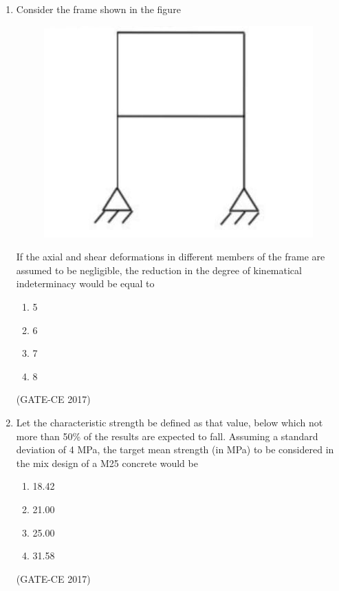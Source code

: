 \documentclass[journal,12pt,onecolumn]{article}
\theoremstyle{remark}
\begin{document}
\begin{enumerate}
    \item Consider the frame shown in the figure 
    \begin{figure}[H]
    \centering
    \includegraphics[width=0.7\columnwidth]{figs/q14.jpg}  
    \caption{}
    \label{fig:5}
    \end{figure}
    If the axial and shear deformations in different members of the frame are assumed to be negligible, the reduction in the degree of kinematical indeterminacy would be equal to
    \begin{multicols}{4}
    \begin{enumerate}
        \item 5  
        \item 6  
        \item 7  
        \item 8  
    \end{enumerate}
    \end{multicols}
    \hfill (GATE-CE 2017)

    \item Let the characteristic strength be defined as that value, below which not more than 50\% of the results are expected to fall. Assuming a standard deviation of 4 MPa, the target mean strength (in MPa) to be considered in the mix design of a M25 concrete would be
    \begin{multicols}{4}
    \begin{enumerate}
        \item 18.42  
        \item 21.00  
        \item 25.00  
        \item 31.58  
    \end{enumerate}
    \end{multicols}
    \hfill (GATE-CE 2017)


\end{enumerate}
\end{document}
